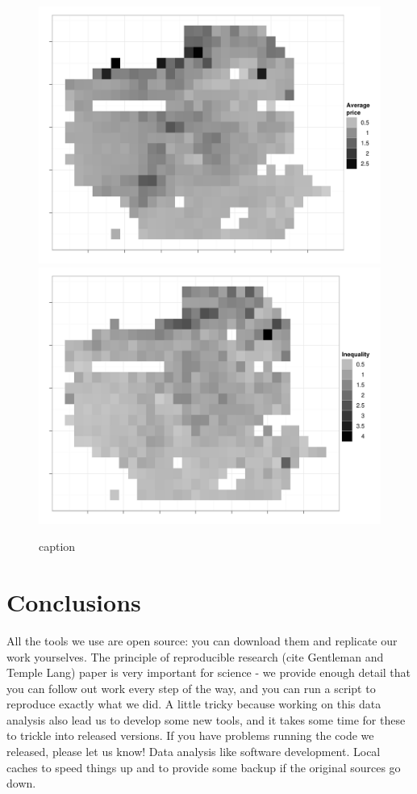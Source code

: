 \documentclass[oneside]{article}
\begin{document}
\begin{figure}[htbp]
  \centering
    \includegraphics[width=0.5\linewidth]{sf-bin-price}%
    \includegraphics[width=0.5\linewidth]{sf-bin-ineq}
  \caption{caption}
  \label{fig:sf-price}
\end{figure}




\section{Conclusions}

All the tools we use are open source: you can download them and replicate our work yourselves.  The principle of reproducible research (cite Gentleman and Temple Lang) paper is very important for science - we provide enough detail that you can follow out work every step of the way, and you can run a script to reproduce exactly what we did.  A little tricky because working on this data analysis also lead us to develop some new tools, and it takes some time for these to trickle into released versions.  If you have problems running the code we released, please let us know!  Data analysis like software development.  Local caches to speed things up and to provide some backup if the original sources go down.
\end{document}
